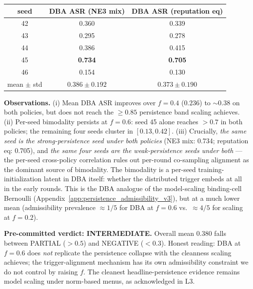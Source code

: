 \documentclass{article}
\begin{document}
\begin{center}\small
\begin{tabular}{c|cc}
\toprule
seed & DBA ASR (NE3 mix) & DBA ASR (reputation eq) \\
\midrule
42 & 0.360 & 0.339 \\
43 & 0.295 & 0.278 \\
44 & 0.386 & 0.415 \\
45 & \textbf{0.734} & \textbf{0.705} \\
46 & 0.154 & 0.130 \\
\midrule
mean $\pm$ std & $0.386 \pm 0.192$ & $0.373 \pm 0.190$ \\
\bottomrule
\end{tabular}
\end{center}

\textbf{Observations.} (i) Mean DBA ASR improves over $f{=}0.4$ ($0.236$) to $\sim 0.38$ on both policies, but does not reach the $\geq 0.85$ persistence band scaling achieves. (ii) Per-seed bimodality persists at $f{=}0.6$: seed 45 alone reaches $> 0.7$ in both policies; the remaining four seeds cluster in $[0.13, 0.42]$. (iii) Crucially, \emph{the same seed is the strong-persistence seed under both policies} (NE3 mix: 0.734; reputation eq: 0.705), and \emph{the same four seeds are the weak-persistence seeds under both} --- the per-seed cross-policy correlation rules out per-round co-sampling alignment as the dominant source of bimodality. The bimodality is a per-seed training-initialization latent in DBA itself: whether the distributed trigger embeds at all in the early rounds. This is the DBA analogue of the model-scaling binding-cell Bernoulli (Appendix~\ref{app:persistence_admissibility_v3}), but at a much lower mean (admissibility prevalence $\approx 1/5$ for DBA at $f{=}0.6$ vs.\ $\approx 4/5$ for scaling at $f{=}0.2$).

\textbf{Pre-committed verdict: INTERMEDIATE.} Overall mean $0.380$ falls between PARTIAL ($> 0.5$) and NEGATIVE ($< 0.3$). Honest reading: DBA at $f{=}0.6$ does \emph{not} replicate the persistence collapse with the cleanness scaling achieves; the trigger-alignment mechanism has its own admissibility constraint we do not control by raising $f$. The cleanest headline-persistence evidence remains model scaling under norm-based menus, as acknowledged in L3.
\end{document}
